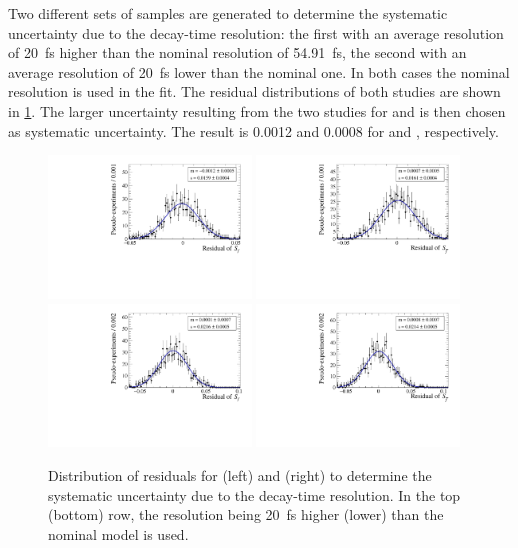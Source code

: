 Two different sets of samples are generated to determine the systematic uncertainty due to the decay-time resolution: the first with an average resolution of \SI{20}{\femto\second} higher than the nominal resolution of \SI{54.91}{\femto\second}, the second with an average resolution of \SI{20}{\femto\second} lower than the nominal one.
In both cases the nominal resolution is used in the fit.
The residual distributions of both studies are shown in \cref{fig:systUncertRes}.
The larger uncertainty resulting from the two studies for \Sf and \Sfbar is then chosen as systematic uncertainty.
The result is \num{0.0012} and \num{0.0008} for \Sf and \Sfbar, respectively.
\begin{figure}[tbp]
    \centering
    \includegraphics[width=0.48\textwidth]{10Systematics/figs/ResHigh_Sf_res.pdf}
    \includegraphics[width=0.48\textwidth]{10Systematics/figs/ResHigh_Sfbar_res.pdf}\\
    \includegraphics[width=0.48\textwidth]{10Systematics/figs/ResLow_Sf_res.pdf}
    \includegraphics[width=0.48\textwidth]{10Systematics/figs/ResLow_Sfbar_res.pdf}
    \caption{Distribution of residuals for \Sf (left) and \Sfbar (right) to determine the systematic uncertainty due to the decay-time resolution.
    In the top  (bottom) row, the resolution being \SI{20}{\femto\second} higher (lower) than the nominal model is used.}
    \label{fig:systUncertRes}
\end{figure}

